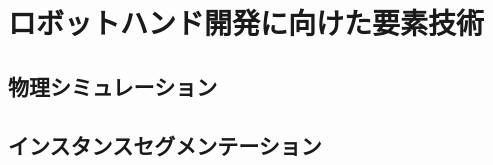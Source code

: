 \chapter{ロボットハンド開発に向けた要素技術}
\label{chap_experiment}


\section{物理シミュレーション}


\section{インスタンスセグメンテーション}

